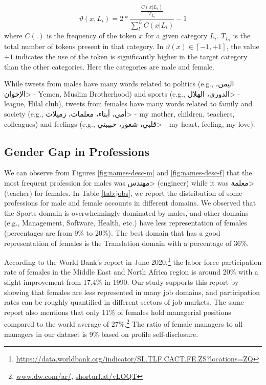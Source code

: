 \documentclass[sigconf,authorversion,nonacm]{acmart}
\begin{document}
\begin{equation}
\label{eq:valence}
    \vartheta (x, L_i) = 2 * \frac{\frac{C(x|L_i)}{T_{L_i}}}{\sum_{l}^{L} C(x|L_l) } -1
\end{equation}
\noindent where $C(.)$ is the frequency of the token $x$ for a given category $L_i$. $T_{L_i}$ is the total number of tokens present in that category. In $\vartheta(x) \in [-1, +1]$, the value $+1$ indicates the use of the token is significantly higher in the target category than the other categories. Here the categories are male and female.

While tweets from males have many words related to politics (e.g., \<اليمن، الإخوان> - Yemen, Muslim Brotherhood) and sports (e.g., \<الدوري، الهلال> - league, Hilal club), tweets from females have many words related to family and society (e.g., \<أمي، أبناء، معلمات، زميلات> - my mother, children, teachers, colleagues) and feelings\newline
(e.g., \<قلبي، شعور، حبيبتي> - my heart, feeling, my love).

\subsection{Gender Gap in Professions}
We can observe from Figures \ref{fig:names-desc-m} and \ref{fig:names-desc-f} that the most frequent profession for males was \<مهندس> (engineer) while it was \<معلمة> (teacher) for females. In Table \ref{tab:jobs}, we report the distribution of some professions for male and female accounts in different domains. We observed that the Sports domain is overwhelmingly dominated by males, and other domains (e.g., Management, Software, Health, etc.) have less representation of females (percentages are from 9\% to 20\%). The best domain that has a good representation of females is the Translation domain with a percentage of 36\%.

According to the World Bank's report in June 2020,\footnote{\url{https://data.worldbank.org/indicator/SL.TLF.CACT.FE.ZS?locations=ZQ}} the labor force participation rate of females in the Middle East and North Africa region is around 20\% with a slight improvement from 17.4\% in 1990. Our study supports this report by showing that females are less represented in many job domains, and participation rates can be roughly quantified in different sectors of job markets. 
The same report also mentions that only 11\% of females hold managerial positions compared to the world average of 27\%.\footnote{\url{www.dw.com/ar/}, \url{shorturl.at/vLOQT}} The ratio of female managers to all managers in our dataset is 9\% based on profile self-disclosure. 
\end{document}
